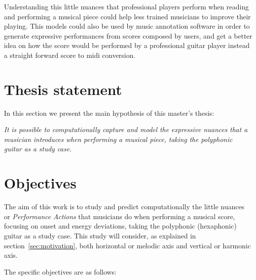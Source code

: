 Understanding this little nuances that professional players perform when reading and performing a musical piece could help less trained musicians to improve their playing. This models could also be used by music annotation software in order to generate expressive performances from scores composed by users, and get a better idea on how the score would be performed by a professional guitar player instead a straight forward score to midi conversion.


\section{Thesis statement}
In this section we present the main hypothesis of this master's thesis:


\textit{It is possible to computationally capture and model the expressive nuances that a musician introduces when performing a musical piece, taking the polyphonic guitar as a study case.}


\section{Objectives}
The aim of this work is to study and predict computationally the little nuances or \textit{Performance Actions} that musicians do when performing a musical score, focusing on onset and energy deviations, taking the polyphonic (hexaphonic) guitar as a study case. This study will consider, as explained in section~\ref{sec:motivation}, both horizontal or melodic axis and vertical or harmonic axis.

The specific objectives are as follows:

